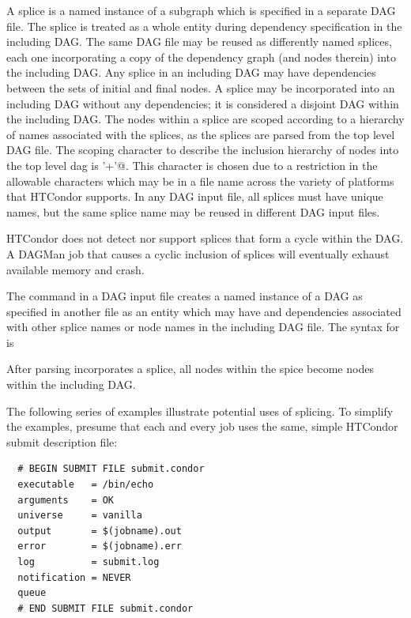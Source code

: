 A splice is a named instance of a subgraph which is specified in a
separate DAG file.
The splice is treated as a whole entity during dependency
specification in the including DAG.
The same DAG file may be reused as differently named splices,
each one
incorporating a copy of the dependency graph (and nodes therein) into the
including DAG. 
Any splice in an including DAG may have dependencies
between the sets of initial and final nodes.
A splice may be incorporated into an including DAG without any
dependencies; it is considered
a disjoint DAG within the including DAG.
The nodes within a splice are scoped according to
a hierarchy of names associated with the splices,
as the splices are parsed from the top level DAG file.
The scoping character to describe the
inclusion hierarchy of nodes into the top level dag is 
\verb@'+'@.
This character is chosen due
to a restriction in the allowable characters which may be in a file name
across the variety of platforms that HTCondor supports.
In any DAG input file, all splices must have unique names,
but the same splice name may be reused in different DAG input files.

HTCondor does not detect nor support splices that form a cycle
within the DAG.
A DAGMan job that causes a cyclic inclusion of splices will
eventually exhaust available memory and crash.

The  command in a DAG input file
creates a named instance of a DAG as specified
in another file as an entity which may have  and 
dependencies associated with other splice names or node names in the
including DAG file.
The syntax for  is

   

After parsing incorporates a splice,
all nodes within the spice become nodes within the including DAG.


The following series of examples illustrate potential uses of
splicing. To simplify the examples,
presume that each and every job uses the same,
simple HTCondor submit description file:

\begin{verbatim}
  # BEGIN SUBMIT FILE submit.condor
  executable   = /bin/echo
  arguments    = OK
  universe     = vanilla
  output       = $(jobname).out
  error        = $(jobname).err
  log          = submit.log
  notification = NEVER
  queue
  # END SUBMIT FILE submit.condor
\end{verbatim}

